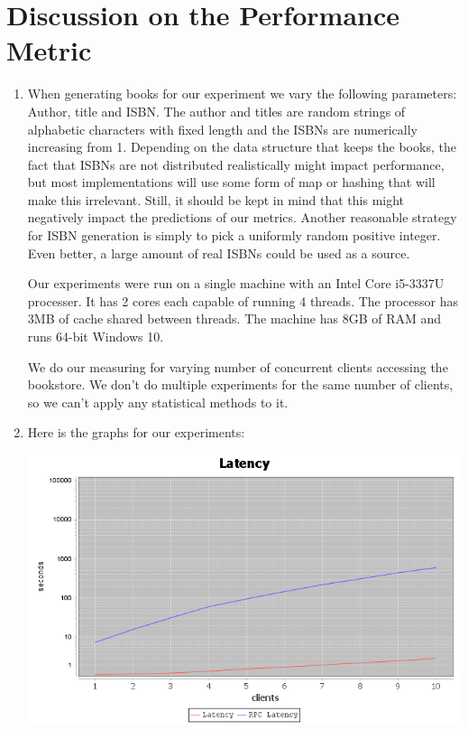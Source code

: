 \documentclass[11pt]{article}
\begin{document}
\section{Discussion on the Performance Metric}
  \begin{enumerate}
    \item
      When generating books for our experiment we vary the following parameters:
      Author, title and ISBN. The author and titles are random strings of alphabetic
      characters with fixed length and the ISBNs are numerically increasing from 1.
      Depending on the data structure that keeps the books, the fact that ISBNs are
      not distributed realistically might impact performance, but most implementations
      will use some form of map or hashing that will make this irrelevant. Still, it
      should be kept in mind that this might negatively impact the predictions of our
      metrics. Another reasonable strategy for ISBN generation is simply to pick a
      uniformly random positive integer. Even better, a large amount of real ISBNs
      could be used as a source.

      Our experiments were run on a single machine with an Intel Core i5-3337U
      processer. It has 2 cores each capable of running 4 threads. The processor has
      3MB of cache shared between threads. The machine has 8GB of RAM and runs 64-bit
      Windows 10.

      We do our measuring for varying number of concurrent clients accessing the
      bookstore. We don't do multiple experiments for the same number of
      clients, so we can't apply any statistical methods to it.

    \item
      Here is the graphs for our experiments:

      \includegraphics[scale=0.5]{latency}


\end{enumerate}
\end{document}
